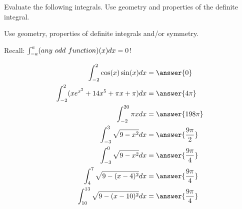 \documentclass{ximera}
\author{Nela Lakos \and Kyle Parsons}
\begin{document}
\begin{exercise}

Evaluate the following integrals.  Use geometry and properties of the definite integral.
\begin{hint}
Use  geometry, properties of definite integrals and/or symmetry.

Recall: $\int_{-a}^a (any \hspace{0.05in}odd\hspace{0.05in} function)(x) dx =0$!
\end{hint}
\begin{align*}
\int_{-2}^2 \cos(x)\sin(x) dx &= \answer{0}\\
\int_{-2}^2 (xe^{x^2} + 14x^5 + \pi x + \pi) dx &= \answer{4\pi}\\
\int_{-2}^{20} \pi x dx &= \answer{198\pi}\\
\int_{-3}^3 \sqrt{9-x^2} dx &= \answer{\frac{9\pi}{2}}\\
\int_{-3}^0 \sqrt{9-x^2} dx &= \answer{\frac{9\pi}{4}}\\
\int_4^7 \sqrt{9-(x-4)^2} dx &= \answer{\frac{9\pi}{4}}\\
\int_{10}^{13} \sqrt{9-(x-10)^2} dx &= \answer{\frac{9\pi}{4}}
\end{align*}

\end{exercise}
\end{document}
